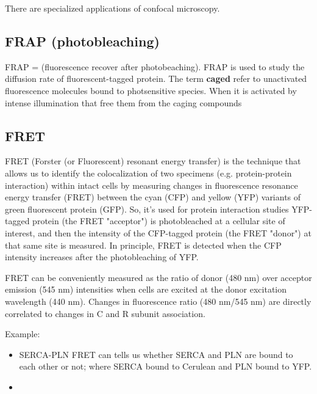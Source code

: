 There are specialized applications of confocal microscopy.

\subsection{FRAP (photobleaching)}
\label{sec:FRAP}

FRAP  = (fluorescence recover after photobeaching). FRAP is used to study the
diffusion rate of fluorescent-tagged protein. The term {\bf caged} refer to
unactivated fluorescence molecules bound to photsensitive species. When it is
activated by intense illumination that free them from the caging compounds

\subsection{FRET}
\label{sec:FRET}

FRET (Forster (or Fluorescent) resonant energy transfer) is the technique that
allows us to identify the colocalization of two specimens (e.g. protein-protein
interaction) within intact cells by  measuring changes in fluorescence resonance
energy transfer (FRET) between the cyan (CFP) and yellow (YFP) variants of green
fluorescent protein (GFP).
So, it's used for protein interaction studies \citep{karpova2006}
YFP-tagged protein (the FRET "acceptor") is photobleached at a cellular site of
interest, and then the intensity of the CFP-tagged protein (the FRET "donor") at
that same site is measured. In principle, FRET is detected when the CFP
intensity increases after the photobleaching of YFP.

FRET can be conveniently measured as the ratio of donor (480 nm) over acceptor
emission (545 nm) intensities when cells are excited at the donor excitation
wavelength (440 nm). Changes in fluorescence ratio (480 nm/545 nm) are directly
correlated to changes in C and R subunit association.

Example: 
\begin{itemize}
  \item  SERCA-PLN FRET can tells us whether SERCA and PLN are bound to each
  other or not; where SERCA bound to Cerulean and PLN bound to YFP.
  
   \item 
\end{itemize}

